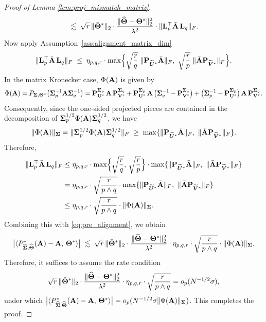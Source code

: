 \documentclass[authoryear,preprint,review,12pt]{elsarticle}
\begin{document}
\begin{proof}[Proof of Lemma \ref{lem:proj_mismatch_matrix}]
\begin{equation}
		\;\lesssim\;
		\sqrt{r}\,\|\bar{\mathbf{\Theta}}^\ast\|_2\cdot
		\frac{\|\widehat{\mathbf{\Theta}}-\mathbf{\Theta}^\ast\|_2^2}{\lambda^2}\cdot
		\|\mathbf{L}_p^\top \bar{\mathbf{A}}\,\mathbf{L}_q\|_F.
	\end{equation} 
	Now apply Assumption~\ref{ass:alignment_matrix_dim}
	\begin{equation}
		\label{eq:apply_alignment}
		\|\bL_p^\top \bar{\bA}\,\bL_q\|_F
		\;\le\;
		\eta_{p,q,r}\cdot
		\max\Bigl\{
		\sqrt{\frac{r}{q}}\;\|\bP_{\widetilde{\bU}^\ast}\bar{\bA}\|_F,\ 
		\sqrt{\frac{r}{p}}\;\|\bar{\bA}\bP_{\widetilde{\bV}^\ast}\|_F
		\Bigr\}.
	\end{equation}
	In the matrix Kronecker case, $\Phi(\mathbf{A})$ is given by
	\[
	\Phi(\mathbf A)
	=
	P_{\mathbf{ \Sigma},\mathbf{\Theta}^\ast}
	\bigl(\mathbf \Sigma_p^{-1}\mathbf A \mathbf \Sigma_q^{-1}\bigr)
	=
	\mathbf P_{\mathbf U^\ast}^{\mathbf \Sigma_p}
	\,\mathbf A\,
	\mathbf P_{\mathbf V^\ast}^{\mathbf \Sigma_q} 
	+
	\mathbf P_{\mathbf U^\ast}^{\mathbf \Sigma_p}
	\,\mathbf A\,
	\bigl(\mathbf \Sigma_q^{-1} - \mathbf P_{\mathbf V^\ast}^{\mathbf \Sigma_q}\bigr) 
	+
	\bigl(\mathbf \Sigma_p^{-1} - \mathbf P_{\mathbf U^\ast}^{\mathbf \Sigma_p}\bigr)
	\,\mathbf A\,
	\mathbf P_{\mathbf V^\ast}^{\mathbf \Sigma_q}.
	\]  
	Consequently, since the one-sided projected pieces are contained in the
	decomposition of $\mathbf{ \Sigma}_p^{1/2}\Phi(\mathbf{A})\mathbf{ \Sigma}_q^{1/2}$, we have
	\begin{equation}
		\label{eq:phi_dominate_onesided}
		\|\Phi(\bA)\|_{\bSigma}
		=
		\|\bSigma_p^{1/2}\Phi(\bA)\bSigma_q^{1/2}\|_F
		\;\ge\;
		\max\{\|\bP_{\widetilde{\bU}^\ast}\bar{\bA}\|_F,\ \|\bar{\bA}\bP_{\widetilde{\bV}^\ast}\|_F\}.
	\end{equation}  
	Therefore,
	\begin{align*}
		\|\bL_p^\top \bar{\bA}\,\bL_q\|_F
		&\le
		\eta_{p,q,r}\cdot
		\max\Bigl\{
		\sqrt{\frac{r}{q}},\,\sqrt{\frac{r}{p}}
		\Bigr\}\cdot
		\max\{\|\bP_{\widetilde{\bU}^\ast}\bar{\bA}\|_F,\ \|\bar{\bA}\bP_{\widetilde{\bV}^\ast}\|_F\}\\
		&=
		\eta_{p,q,r}\cdot
		\sqrt{\frac{r}{p\wedge q}}\cdot
		\max\{\|\bP_{\widetilde{\bU}^\ast}\bar{\bA}\|_F,\ \|\bar{\bA}\bP_{\widetilde{\bV}^\ast}\|_F\}\\
		&\le
		\eta_{p,q,r}\cdot
		\sqrt{\frac{r}{p\wedge q}}\cdot
		\|\Phi(\bA)\|_{\bSigma}.
	\end{align*}
	Combining this with \eqref{eq:pre_alignment}, we obtain
	\[
	\big|\langle 
	P_{\widehat{\mathbf{ \Sigma}},\widehat{\mathbf{\Theta}}}^\ast(\mathbf{A})-\mathbf{A},\, \mathbf{\Theta}^\ast \rangle\big|
	\;\lesssim\;
	\sqrt{r}\,\|\bar{\mathbf{\Theta}}^\ast\|_2\cdot
	\frac{\|\widehat{\mathbf{\Theta}}-\mathbf{\Theta}^\ast\|_2^2}{\lambda^2}\cdot
	\eta_{p,q,r}\cdot
	\sqrt{\frac{r}{p\wedge q}}\cdot
	\|\Phi(\mathbf{A})\|_{\mathbf{ \Sigma}}.
	\]
	Therefore, it suffices to assume the rate condition
	\[
	\sqrt{r}\,\|\bar{\mathbf{\Theta}}^\ast\|_2\cdot \frac{\|\widehat{\mathbf{\Theta}}-\mathbf{\Theta}^\ast\|_2^2}{\lambda^2}\cdot
	\eta_{p,q,r}\cdot
	\sqrt{\frac{r}{p\wedge q}}
	=
	o_p(N^{-1/2}\sigma),
	\]
	under which
	$\big|\langle 
	P_{\widehat{\mathbf{ \Sigma}},\widehat{\mathbf{\Theta}}}^\ast(\mathbf{A})-\mathbf{A},\, \mathbf{\Theta}^\ast \rangle\big|
	=o_p(N^{-1/2}\sigma\|\Phi(\mathbf{A})\|_{\mathbf{ \Sigma}})$.
	This completes the proof. 	 
\end{proof}
\end{document}
